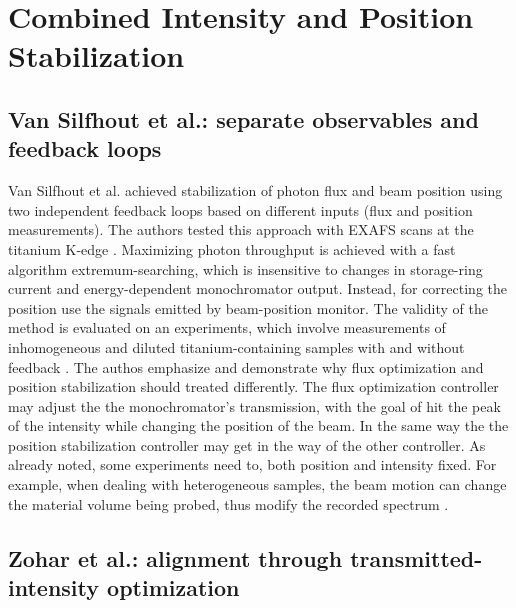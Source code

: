 \section{Combined Intensity and Position Stabilization}

\subsection{Van Silfhout et al.: separate observables and feedback loops}

Van Silfhout et al. achieved stabilization of photon flux and beam position using two independent feedback loops based on different inputs (flux and position measurements).
The authors tested this approach with EXAFS scans at the titanium K-edge \cite{vanSilfhout2014}. 
Maximizing photon throughput is achieved with a fast algorithm extremum-searching, which is insensitive to changes in storage-ring current and energy-dependent monochromator output.
Instead, for correcting the position use the signals emitted by beam-position monitor.
The validity of the method is evaluated on an experiments, which involve measurements of inhomogeneous and diluted titanium-containing samples with and without feedback \cite{vanSilfhout2014}.
The authos emphasize and demonstrate why flux optimization and position stabilization should treated differently. 
The flux optimization controller may adjust the the monochromator's transmission, with the goal of hit the peak of the intensity while changing the position of the beam.
In the same way the the position stabilization controller may get in the way of the other controller.
As already noted, some experiments need to, both position and intensity fixed.
For example, when dealing with heterogeneous samples, the beam motion can change the material volume being probed, thus modify the recorded spectrum \cite{vanSilfhout2014}.

\subsection{Zohar et al.: alignment through transmitted-intensity optimization}

